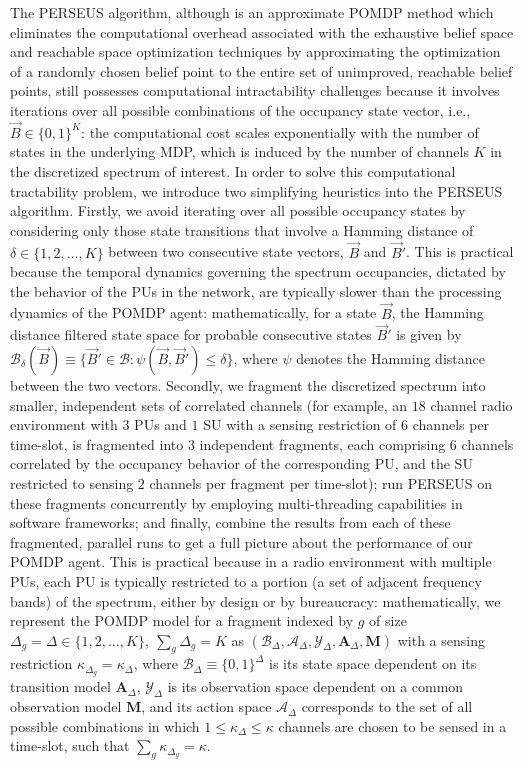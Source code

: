 \documentclass[10pt, twocolumn]{IEEEtran}
\begin{document}
The PERSEUS algorithm, although is an approximate POMDP method which eliminates the computational overhead associated with the exhaustive belief space and reachable space optimization techniques \cite{PUOccupancy:18,PUOccupancy:17} by approximating the optimization of a randomly chosen belief point to the entire set of unimproved, reachable belief points, still possesses computational intractability challenges because it involves iterations over all possible combinations of the occupancy state vector, i.e., $\vec{B}{\in}\{0,1\}^{K}$: the computational cost scales exponentially with the number of states in the underlying MDP, which is induced by the number of channels $K$ in the discretized spectrum of interest. In order to solve this computational tractability problem, we introduce two simplifying heuristics into the PERSEUS algorithm. Firstly, we avoid iterating over all possible occupancy states by considering only those state transitions that involve a Hamming distance of $\delta{\in}\{1,2,\dots,K\}$ between two consecutive state vectors, $\vec{B}$ and $\vec{B}'$. This is practical because the temporal dynamics governing the spectrum occupancies, dictated by the behavior of the PUs in the network, are typically slower than the processing dynamics of the POMDP agent: mathematically, for a state $\vec{B}$, the Hamming distance filtered state space for probable consecutive states $\vec{B}'$ is given by $\mathcal{B}_{\delta}(\vec{B}){\equiv}\{\vec{B}'{\in}\mathcal{B}:\psi(\vec{B},\vec{B}'){\leq}\delta\}$, where $\psi$ denotes the Hamming distance between the two vectors. Secondly, we fragment the discretized spectrum into smaller, independent sets of correlated channels (for example, an $18$ channel radio environment with $3$ PUs and $1$ SU with a sensing restriction of $6$ channels per time-slot, is fragmented into $3$ independent fragments, each comprising $6$ channels correlated by the occupancy behavior of the corresponding PU, and the SU restricted to sensing $2$ channels per fragment per time-slot); run PERSEUS on these fragments concurrently by employing multi-threading capabilities in software frameworks; and finally, combine the results from each of these fragmented, parallel runs to get a full picture about the performance of our POMDP agent. This is practical because in a radio environment with multiple PUs, each PU is typically restricted to a portion (a set of adjacent frequency bands) of the spectrum, either by design or by bureaucracy: mathematically, we represent the POMDP model for a fragment indexed by $g$ of size $\Delta_{g}{=}\Delta{\in}\{1,2,\dots,K\},\ \sum_{g} \Delta_{g}{=}K$ as $(\mathcal{B}_{\Delta},\mathcal{A}_{\Delta},\mathcal{Y}_{\Delta},\mathbf{A}_{\Delta},\mathbf{M})$ with a sensing restriction $\kappa_{\Delta_{g}}{=}\kappa_{\Delta}$, where $\mathcal{B}_{\Delta}{\equiv}\{0,1\}^{\Delta}$ is its state space dependent on its transition model $\mathbf{A}_{\Delta}$, $\mathcal{Y}_{\Delta}$ is its observation space dependent on a common observation model $\mathbf{M}$, and its action space $\mathcal{A}_{\Delta}$ corresponds to the set of all possible combinations in which $1{\leq}\kappa_{\Delta}{\leq}\kappa$ channels are chosen to be sensed in a time-slot, such that $\sum_{g}\kappa_{\Delta_{g}}{=}\kappa$.
\end{document}
